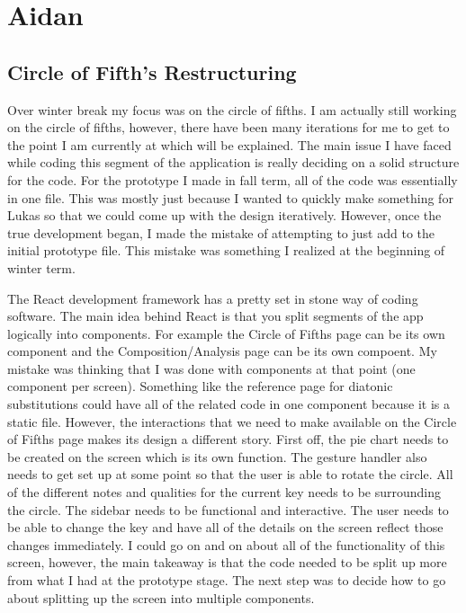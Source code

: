 \documentclass[onecolumn, draftclsnofoot,10pt, compsoc]{IEEEtran}
\begin{document}
\section{Aidan}
\subsection{Circle of Fifth's Restructuring}
Over winter break my focus was on the circle of fifths. 
I am actually still working on the circle of fifths, however, there have been many iterations for me to get to the point I am currently at which will be explained. 
The main issue I have faced while coding this segment of the application is really deciding on a solid structure for the code. 
For the prototype I made in fall term, all of the code was essentially in one file. 
This was mostly just because I wanted to quickly make something for Lukas so that we could come up with the design iteratively. 
However, once the true development began, I made the mistake of attempting to just add to the initial prototype file. 
This mistake was something I realized at the beginning of winter term.

The React development framework has a pretty set in stone way of coding software. 
The main idea behind React is that you split segments of the app logically into components. 
For example the Circle of Fifths page can be its own component and the Composition/Analysis page can be its own compoent. 
My mistake was thinking that I was done with components at that point (one component per screen). 
Something like the reference page for diatonic substitutions could have all of the related code in one component because it is a static file. 
However, the interactions that we need to make available on the Circle of Fifths page makes its design a different story. 
First off, the pie chart needs to be created on the screen which is its own function. 
The gesture handler also needs to get set up at some point so that the user is able to rotate the circle. 
All of the different notes and qualities for the current key needs to be surrounding the circle. 
The sidebar needs to be functional and interactive. 
The user needs to be able to change the key and have all of the details on the screen reflect those changes immediately. 
I could go on and on about all of the functionality of this screen, however, the main takeaway is that the code needed to be split up more from what I had at the prototype stage. 
The next step was to decide how to go about splitting up the screen into multiple components.
\end{document}
